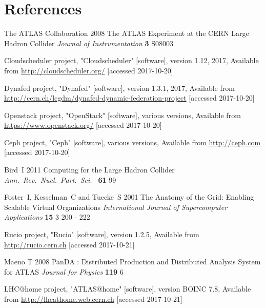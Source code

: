 \documentclass[a4paper]{jpconf}
\begin{document}
\section*{References}
\begin{thebibliography}{9}
  The ATLAS Collaboration 2008 The ATLAS Experiment at the CERN Large Hadron Collider
  {\it Journal of Instrumentation} {\bf 3} S08003

  Cloudscheduler project, "Cloudscheduler" [software], version 1.12, 2017, Available from \url{http://cloudscheduler.org/} [accessed 2017-10-20]

  Dynafed project, "Dynafed" [software], version 1.3.1, 2017, Available from \url{http://cern.ch/lcgdm/dynafed-dynamic-federation-project}  [accessed 2017-10-20]

  Openstack project, "OpenStack" [software], various versions, Available from \url{https://www.openstack.org/} [accessed 2017-10-20]

  Ceph project, "Ceph" [software], various versions, Available from \url{http://ceph.com} [accessed 2017-10-20]


  Bird~I
  2011
  Computing for the Large Hadron Collider
  {\it Ann.\ Rev.\ Nucl.\ Part.\ Sci.\ } {\bf 61} 99

  Foster~I, Kesselman~C and Tuecke~S
  2001
  The Anatomy of the Grid: Enabling Scalable Virtual Organizations
  {\it International Journal of Supercomputer Applications} {\bf 15} 3 200 - 222

  Rucio project, "Rucio" [software], version 1.2.5, Available from \url{http://rucio.cern.ch} [accessed 2017-10-21]

%
%
%

  Maeno T
  2008
  PanDA : Distributed Production and Distributed Analysis System for ATLAS
  {\it Journal for Physics} {\bf 119} 6

  LHC@home project, "ATLAS@home" [software], version BOINC 7.8, Available from \url{http://lhcathome.web.cern.ch} [accessed 2017-10-21]

\end{thebibliography}
\end{document}
